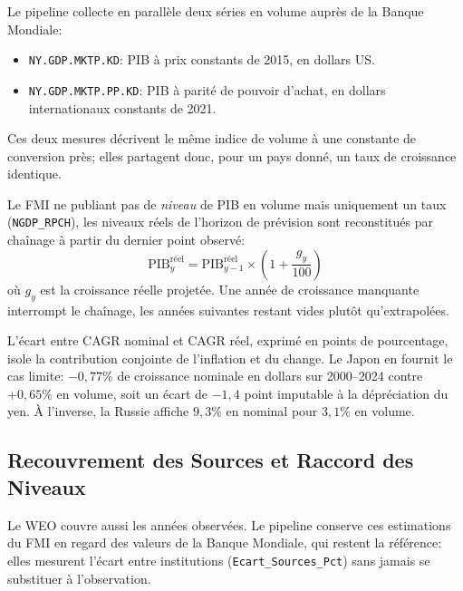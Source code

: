 \documentclass[11pt,a4paper]{article}
\begin{document}
Le pipeline collecte en parallèle deux séries en volume auprès de la Banque Mondiale:
\begin{itemize}
    \item \texttt{NY.GDP.MKTP.KD}: PIB à prix constants de 2015, en dollars US.
    \item \texttt{NY.GDP.MKTP.PP.KD}: PIB à parité de pouvoir d'achat, en dollars internationaux constants de 2021.
\end{itemize}

Ces deux mesures décrivent le même indice de volume à une constante de conversion près; elles partagent donc, pour un pays donné, un taux de croissance identique.

Le FMI ne publiant pas de \emph{niveau} de PIB en volume mais uniquement un taux (\texttt{NGDP\_RPCH}), les niveaux réels de l'horizon de prévision sont reconstitués par chaînage à partir du dernier point observé:
\begin{equation}
\text{PIB}^{\text{réel}}_{y} = \text{PIB}^{\text{réel}}_{y-1} \times \left(1 + \frac{g_{y}}{100}\right)
\end{equation}
où $g_{y}$ est la croissance réelle projetée. Une année de croissance manquante interrompt le chaînage, les années suivantes restant vides plutôt qu'extrapolées.

L'écart entre CAGR nominal et CAGR réel, exprimé en points de pourcentage, isole la contribution conjointe de l'inflation et du change. Le Japon en fournit le cas limite: $-0{,}77\%$ de croissance nominale en dollars sur 2000--2024 contre $+0{,}65\%$ en volume, soit un écart de $-1{,}4$ point imputable à la dépréciation du yen. À l'inverse, la Russie affiche $9{,}3\%$ en nominal pour $3{,}1\%$ en volume.

\subsection{Recouvrement des Sources et Raccord des Niveaux}
Le WEO couvre aussi les années observées. Le pipeline conserve ces estimations du FMI en regard des valeurs de la Banque Mondiale, qui restent la référence: elles mesurent l'écart entre institutions (\texttt{Ecart\_Sources\_Pct}) sans jamais se substituer à l'observation.
\end{document}
